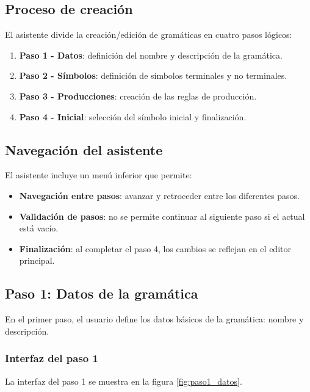 \subsection{Proceso de creación}

El asistente divide la creación/edición de gramáticas en cuatro pasos lógicos:

\begin{enumerate}
    \item \textbf{Paso 1 - Datos}: definición del nombre y descripción de la gramática.
    \item \textbf{Paso 2 - Símbolos}: definición de símbolos terminales y no terminales.
    \item \textbf{Paso 3 - Producciones}: creación de las reglas de producción.
    \item \textbf{Paso 4 - Inicial}: selección del símbolo inicial y finalización.
\end{enumerate}

\subsection{Navegación del asistente}

El asistente incluye un menú inferior que permite:

\begin{itemize}
    \item \textbf{Navegación entre pasos}: avanzar y retroceder entre los diferentes pasos.
    \item \textbf{Validación de pasos}: no se permite continuar al siguiente paso si el actual está vacío.
    \item \textbf{Finalización}: al completar el paso 4, los cambios se reflejan en el editor principal.
\end{itemize}

\subsection{Paso 1: Datos de la gramática}

En el primer paso, el usuario define los datos básicos de la gramática: nombre y descripción.

\subsubsection{Interfaz del paso 1}

La interfaz del paso 1 se muestra en la figura \ref{fig:paso1_datos}.

